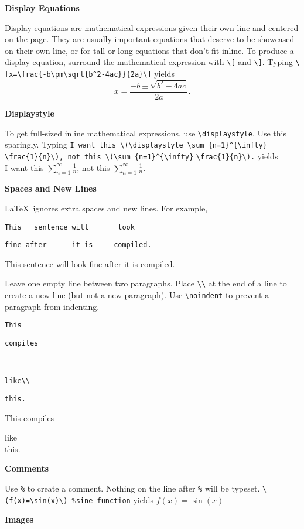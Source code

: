 \documentclass[10pt,landscape]{article}
\newcommand{\ColorSection}[1]{\par\vspace{1.5ex}\noindent\textcolor{sectioncolor}{\Large\bfseries #1}\par\vspace{0.75ex}}
\newcommand{\ColorSubsection}[1]{\par\vspace{1ex}\noindent\textcolor{subsectioncolor}{\normalsize\bfseries #1}\par\vspace{0.5ex}}
\begin{document}
\begin{multicols}{3}
\ColorSubsection{Display Equations}
Display equations are mathematical expressions given their own line and centered on the page. They are usually important equations that deserve to be showcased on their own line, or for tall or long equations that don't fit inline. To produce a display equation, surround the mathematical expression with \verb!\[! and \verb!\]!. Typing \verb!\[x=\frac{-b\pm\sqrt{b^2-4ac}}{2a}\]! yields \[x=\frac{-b\pm\sqrt{b^2-4ac}}{2a}.\]
 
\ColorSubsection{Displaystyle} 
To get full-sized inline mathematical expressions, use  \verb!\displaystyle!. Use this sparingly. Typing \verb!I want this \(\displaystyle \sum_{n=1}^{\infty}! \verb!\frac{1}{n}\), not this \(\sum_{n=1}^{\infty}! \verb!\frac{1}{n}\).! yields\\ I want  this \(\displaystyle \sum_{n=1}^{\infty}\frac{1}{n}\), not this \(\sum_{n=1}^{\infty}\frac{1}{n}.\)



\columnbreak



\ColorSection{Spaces and New Lines}

\LaTeX\ ignores extra spaces and new lines. For example, 

\verb!This   sentence will       look!

\verb!fine after      it is     compiled.!

This   sentence will       look
fine after      it is     compiled.


Leave one empty line between two paragraphs. Place \verb!\\! at the end of a line to create a new line (but not a new paragraph). Use  \verb!\noindent! to prevent a paragraph from indenting.

\verb!This!

\verb!compiles!

~

\verb!like\\!

\verb!this.!

This
compiles 

like\\
this.



\ColorSection{Comments}

Use \verb!%! to create a comment. Nothing on the line after \verb!%! will be typeset. \verb!\(f(x)=\sin(x)\) %sine function! yields \(f(x)=\sin(x)\)

\ColorSection{Images}


\end{multicols}
\end{document}
